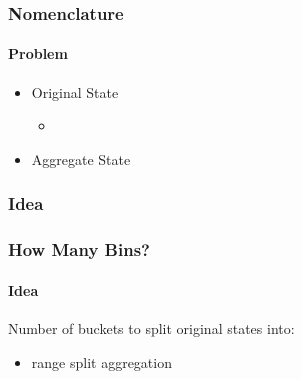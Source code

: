\documentclass{beamer}
\begin{document}
\begin{frame}
    \frametitle{Nomenclature}
    \framesubtitle{Problem}

    
    \begin{itemize}
        \item Original State
            \begin{itemize}
                \item 
            \end{itemize}
        \item Aggregate State
    \end{itemize}

\end{frame}


\begin{frame}
    \frametitle{Idea}
    
    
\end{frame}


\begin{frame}
    \frametitle{How Many Bins?}
    \framesubtitle{Idea}

    Number of buckets to split original states into:
    \begin{itemize}
        \item range split aggregation
    \end{itemize}
    
    
\end{frame}


\begin{frame}
    \frametitle{}
    
    
\end{frame}

\begin{frame}
    \frametitle{}
    
    
\end{frame}

\begin{frame}
    \frametitle{}
    
    
\end{frame}

\begin{frame}
    \frametitle{}
    
    
\end{frame}

\begin{frame}
    \frametitle{}
    
    
\end{frame}

\begin{frame}
    \frametitle{}
    
    
\end{frame}

    
\end{document}
